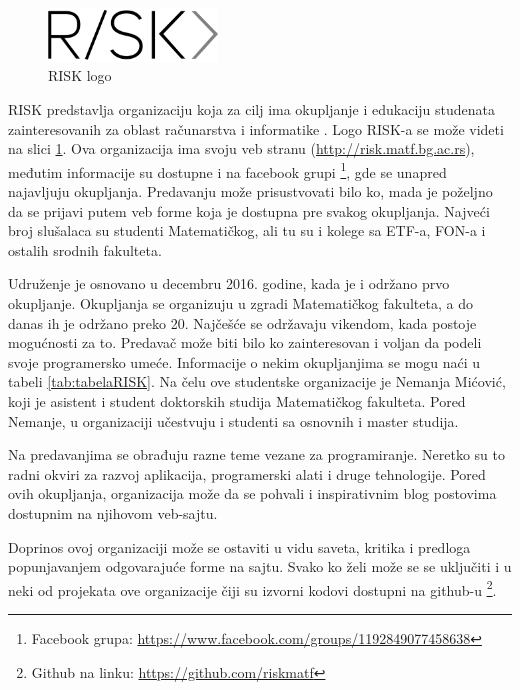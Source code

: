 \documentclass[a4paper]{article}
\begin{document}
{\begin{figure}[H]
  \centering
  \includegraphics[width=0.4\textwidth]{riskmatf.png}
  \caption{RISK logo}
  \label{fig:RISKlogo}
\end{figure}

RISK predstavlja organizaciju koja za cilj ima okupljanje i edukaciju studenata zainteresovanih za oblast računarstva i informatike \cite{aboutRisk}.
Logo RISK-a se može videti na slici \ref{fig:RISKlogo}. Ova organizacija ima svoju veb stranu (\url{http://risk.matf.bg.ac.rs}), međutim informacije su dostupne i na facebook grupi \footnote{Facebook grupa: \url{https://www.facebook.com/groups/1192849077458638}}, gde se unapred najavljuju okupljanja. Predavanju može prisustvovati bilo ko, mada je poželjno da se prijavi putem veb forme koja je dostupna pre svakog okupljanja. Najveći broj slušalaca su
studenti Matematičkog, ali tu su i kolege sa ETF-a, FON-a i ostalih srodnih fakulteta.

Udruženje je osnovano u decembru 2016. godine, kada je i održano prvo okupljanje. Okupljanja se organizuju u zgradi Matematičkog fakulteta, a do danas ih je održano preko 20. Najčešće se održavaju vikendom, kada postoje mogućnosti za to. Predavač može biti bilo ko zainteresovan i voljan da podeli svoje programersko umeće. Informacije o nekim okupljanjima se mogu naći u tabeli \ref{tab:tabelaRISK}. Na čelu ove studentske organizacije je Nemanja Mićović, koji je asistent i student doktorskih studija Matematičkog fakulteta. Pored Nemanje, u organizaciji učestvuju i studenti sa osnovnih i master studija.

Na predavanjima se obrađuju razne teme vezane za programiranje. Neretko su to radni okviri za razvoj aplikacija, programerski alati i druge tehnologije.
Pored ovih okupljanja, organizacija može da se pohvali i inspirativnim blog postovima dostupnim na njihovom veb-sajtu.

Doprinos ovoj organizaciji može se ostaviti u vidu saveta, kritika i predloga popunjavanjem odgovarajuće forme na sajtu. Svako ko želi može se se uključiti
i u neki od projekata ove organizacije čiji su izvorni kodovi dostupni na github-u \footnote{Github na linku: \url{https://github.com/riskmatf}}.

}
\end{document}
